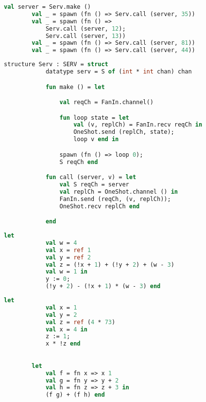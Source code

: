 \documentclass{article}
\begin{document}
    \begin{lstlisting}[language=ML, style=codestyle1]
        val server = Serv.make ()
        val _ = spawn (fn () => Serv.call (server, 35))
        val _ = spawn (fn () => 
            Serv.call (server, 12); 
            Serv.call (server, 13))
        val _ = spawn (fn () => Serv.call (server, 81))
        val _ = spawn (fn () => Serv.call (server, 44))
        \end{lstlisting}

    \begin{lstlisting}[language=ML, style=codestyle1]
        structure Serv : SERV = struct 
            datatype serv = S of (int * int chan) chan 

            fun make () = let 

                val reqCh = FanIn.channel()

                fun loop state = let
                    val (v, replCh) = FanIn.recv reqCh in 
                    OneShot.send (replCh, state);
                    loop v end in

                spawn (fn () => loop 0);
                S reqCh end 

            fun call (server, v) = let 
                val S reqCh = server
                val replCh = OneShot.channel () in 
                FanIn.send (reqCh, (v, replCh));
                OneShot.recv replCh end

            end
        \end{lstlisting}

    \begin{lstlisting}[language=ML, style=codestyle1]
        let
            val w = 4
            val x = ref 1
            val y = ref 2
            val z = (!x + 1) + (!y + 2) + (w - 3)
            val w = 1 in
            y := 0;
            (!y + 2) - (!x + 1) * (w - 3) end
        \end{lstlisting}

    \begin{lstlisting}[language=ML, style=codestyle1]
        let 
            val x = 1    
            val y = 2
            val z = ref (4 * 73)
            val x = 4 in 
            z := 1; 
            x * !z end
        \end{lstlisting}

    \begin{lstlisting}[language=ML, style=codestyle1]

        let 
            val f = fn x => x 1
            val g = fn y => y + 2
            val h = fn z => z + 3 in 
            (f g) + (f h) end

    \end{lstlisting}
\end{document}
